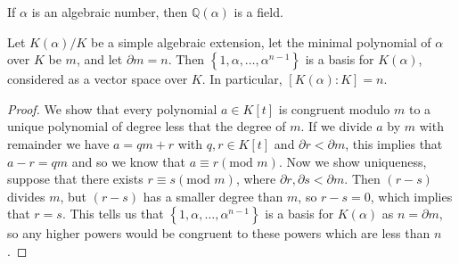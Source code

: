 \begin{corollary}
	If \(\alpha\) is an algebraic number, then \(\mathbb{Q}(\alpha)\) is a field.
\end{corollary}



\begin{theorem} \label{thm:degree-theorem}
    Let $K(\alpha) / K$ be a simple algebraic extension, let the minimal polynomial of $\alpha$ over $K$ be $m$, and let $\partial m=n$. Then $\left\{1, \alpha, \ldots, \alpha^{n-1}\right\}$ is a basis for $K(\alpha)$, considered as a vector space over $K$. In particular, \([K(\alpha):K]=n\). \label{algebraic case}
\end{theorem}

\begin{proof}
    We show that every polynomial \(a \in K[t]\) is congruent modulo \(m\) to a unique polynomial of degree less that the degree of \(m\). If we divide \(a\) by \(m\) with remainder we have \(a = qm + r\) with \(q,r \in K[t]\) and \(\partial r < \partial m\), this implies that \(a - r =qm\) and so we know that \(a \equiv r (\text{mod } m)\). Now we show uniqueness, suppose that there exists \(r \equiv s(\text{mod }m)\), where \(\partial r, \partial s < \partial m\). Then \((r - s)\) divides \(m\), but \((r-s)\) has a smaller degree than \(m\), so \(r-s=0\), which implies that \(r=s\). This tells us that $\left\{1, \alpha, \ldots, \alpha^{n-1}\right\}$ is a basis for \(K(\alpha)\) as \(n = \partial m\), so any higher powers would be congruent to these powers which are less than \(n\).
    \end{proof}

